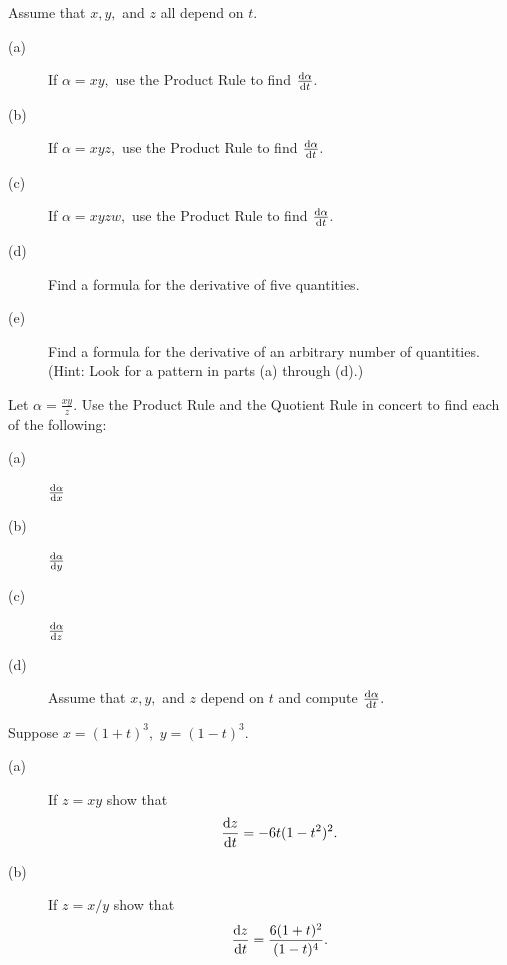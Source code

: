  \begin{ProblemSection}
 \begin{myproblem}{}\label{prob:1}
   Assume that $x, y,$ and $z$ all depend on $t.$
      \begin{description}
      \item[(a)] If $\alpha=xy,$ use the Product Rule to find
        $\frac{\text{d}{\alpha}}{\text{d}{t}}.$
      \item[(b)] If $\alpha=xyz,$ use the Product Rule to find
        $\frac{\text{d}{\alpha}}{\text{d}{t}}.$
    \item[(c)] If $\alpha=xyzw,$ use the Product Rule to find
      $\frac{\text{d}{\alpha}}{\text{d}{t}}.$
    \item[(d)] Find a formula for the derivative of five quantities.
    \item[(e)] Find a formula for the derivative of an arbitrary
      number of quantities. (Hint: Look for a pattern in parts (a)
      through (d).)
      \end{description}
  \end{myproblem}

    \begin{myproblem}{}
      Let $\alpha=\frac{xy}{z}.$ Use the Product Rule and the Quotient
      Rule in concert to find each of the following:
      \begin{multicols}{2}
        \begin{description}
        \item[(a)] $\frac{\text{d}{\alpha}}{\text{d}{x}}$
        \item[(b)] $\frac{\text{d}{\alpha}}{\text{d}{y}}$
        \item[(c)] $\frac{\text{d}{\alpha}}{\text{d}{z}}$
        \item[(d)] Assume that $x, y,$ and $z$ depend on $t$ and
          compute $\frac{\text{d}{\alpha}}{\text{d}{t}}.$
        \end{description}
      \end{multicols}
    \end{myproblem}

    \begin{myproblem}{}
      Suppose $x=(1+t)^3,$ $y=(1-t)^3.$ 
      \begin{description}
      \item[(a)] If $z=xy$ show that
        \[
        \frac{\text{d}{z}}{\text{d}{t}} = -6t(1-t^2)^2.
        \]
      \item[(b)] If $z=x/y$ show that
        \[
        \frac{\text{d}{z}}{\text{d}{t}} = \frac{6(1+t)^2}{(1-t)^4}.
        \]
      \end{description}
    \end{myproblem}


\end{ProblemSection}
